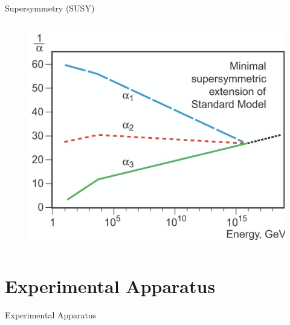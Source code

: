 \documentclass{beamer}
\begin{document}
{\begin{frame}{Supersymmetry (SUSY)}
\begin{columns}
\begin{column}{0.3\textwidth}
\begin{figure}
                \includegraphics[scale=0.13]{figures/coupling_constants_susy.png}
            \end{figure}
        \end{column}
    \end{columns}
            
\end{frame}
}

\section{Experimental Apparatus}

{
\begin{frame}{Experimental Apparatus}
\end{frame}
}
\end{document}
